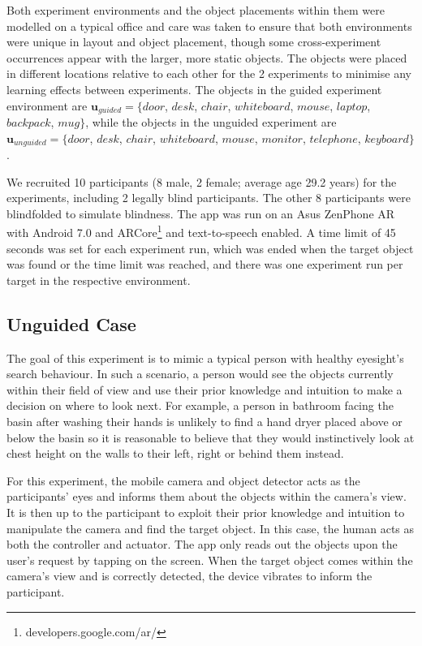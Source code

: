 \documentclass[runningheads]{llncs}
\begin{document}
Both experiment environments and the object placements within them were modelled on a typical office and care was taken to ensure that both environments were unique in layout and object placement, though some cross-experiment occurrences appear with the larger, more static objects. 
The objects were placed in different locations relative to each other for the 2 experiments to minimise any learning effects between experiments. 
The objects in the guided experiment environment are $\mathbf{u}_{guided} = \{ door$, $desk$, $chair$, $whiteboard$, $mouse$, $laptop$, $backpack$, $mug \}$, while the objects in the unguided experiment are $\mathbf{u}_{unguided} = \{ door$, $desk$, $chair$, $whiteboard$, $mouse$, $monitor$, $telephone$, $keyboard \}$.

We recruited 10 participants (8 male, 2 female; average age 29.2 years) for the experiments, including 2 legally blind participants. 
The other 8 participants were blindfolded to simulate blindness. 
The app was run on an Asus ZenPhone AR with Android 7.0 and ARCore\footnote{developers.google.com/ar/} and text-to-speech enabled. 
A time limit of 45 seconds was set for each experiment run, which was ended when the target object was found or the time limit was reached, and there was one experiment run per target in the respective environment.

\subsection{Unguided Case}

The goal of this experiment is to mimic a typical person with healthy eyesight's search behaviour. 
In such a scenario, a person would see the objects currently within their field of view and use their prior knowledge and intuition to make a decision on where to look next.
For example, a person in bathroom facing the basin after washing their hands is unlikely to find a hand dryer placed above or below the basin so it is reasonable to believe that they would instinctively look at chest height on the walls to their left, right or behind them instead. 

For this experiment, the mobile camera and object detector acts as the participants' eyes and informs them about the objects within the camera's view.
It is then up to the participant to exploit their prior knowledge and intuition to manipulate the camera and find the target object. 
In this case, the human acts as both the controller and actuator. 
The app only reads out the objects upon the user's request by tapping on the screen. 
When the target object comes within the camera's view and is correctly detected, the device vibrates to inform the participant. 
\end{document}

